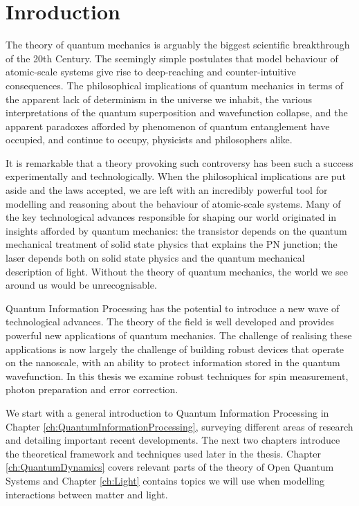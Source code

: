 \chapter{Inroduction} 
\label{ch:Motivation}

The theory of quantum mechanics is arguably the biggest scientific breakthrough of the 20th Century. The seemingly simple postulates that model behaviour of atomic-scale systems give rise to deep-reaching and counter-intuitive consequences. The philosophical implications of quantum mechanics in terms of the apparent lack of determinism in the universe we inhabit, the various interpretations of the quantum superposition and wavefunction collapse, and the apparent paradoxes afforded by phenomenon of quantum entanglement have occupied, and continue to occupy, physicists and philosophers alike.

It is remarkable that a theory provoking such controversy has been such a success experimentally and technologically. When the philosophical implications are put aside and the laws accepted, we are left with an incredibly powerful tool for modelling and reasoning about the behaviour of atomic-scale systems. Many of the key technological advances responsible for shaping our world originated in insights afforded by quantum mechanics: the transistor depends on the quantum mechanical treatment of solid state physics that explains the PN junction; the laser depends both on solid state physics and the quantum mechanical description of light. Without the theory of quantum mechanics, the world we see around us would be unrecognisable.

Quantum Information Processing has the potential to introduce a new wave of technological advances. The theory of the field is well developed and provides  powerful new applications of quantum mechanics. The challenge of realising these applications is now largely the challenge of building robust devices that operate on the nanoscale, with an ability to protect information stored in the quantum wavefunction. In this thesis we examine robust techniques for spin measurement, photon preparation and error correction.

We start with a general introduction to Quantum Information Processing in Chapter \ref{ch:QuantumInformationProcessing}, surveying different areas of research and detailing important recent developments. The next two chapters introduce the theoretical framework and techniques used later in the thesis. Chapter \ref{ch:QuantumDynamics} covers relevant parts of the theory of Open Quantum Systems and Chapter \ref{ch:Light} contains topics we will use when modelling interactions between matter and light.

